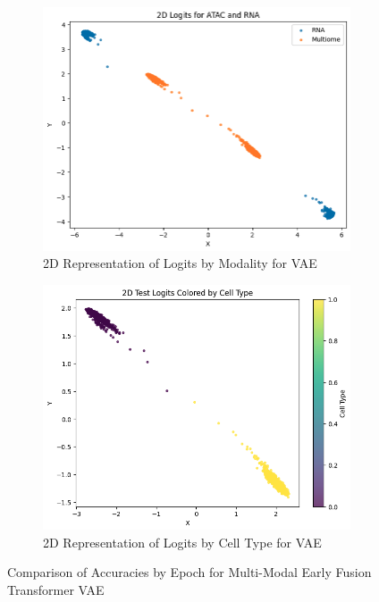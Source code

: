 \documentclass[11pt,a4paper]{article}
\begin{document}
\begin{figure}[H]
    \centering
    \begin{subfigure}[b]{0.45\linewidth}
        \centering
        \includegraphics[width=\linewidth]{Figure 4 Final.png}
        \caption{2D Representation of Logits by Modality for VAE}
        \label{fig:figure7}
    \end{subfigure}
    \hfill
    \begin{subfigure}[b]{0.45\linewidth}
        \centering
        \includegraphics[width=\linewidth]{Figure 5 Final.png}
        \caption{2D Representation of Logits by Cell Type for VAE}
        \label{fig:figure12}
    \end{subfigure}

    \caption{Comparison of Accuracies by Epoch for Multi-Modal Early Fusion Transformer VAE}
    \label{fig:comparison}
\end{figure}
\end{document}
